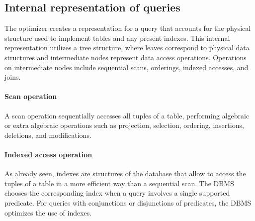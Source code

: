 \subsection{Internal representation of queries}
The optimizer creates a representation for a query that accounts for the physical structure used to implement tables and any present indexes. 
This internal representation utilizes a tree structure, where leaves correspond to physical data structures and intermediate nodes represent data access operations. 
Operations on intermediate nodes include sequential scans, orderings, indexed accesses, and joins.

\paragraph*{Scan operation}
A scan operation sequentially accesses all tuples of a table, performing algebraic or extra algebraic operations such as projection, selection, ordering, insertions, deletions, and modifications.

\paragraph*{Indexed access operation}
As already seen, indexes are structures of the database that allow to access the tuples of a table in a more efficient way than a sequential scan. 
The DBMS chooses the corresponding index when a query involves a single supported predicate. 
For queries with conjunctions or disjunctions of predicates, the DBMS optimizes the use of indexes.

